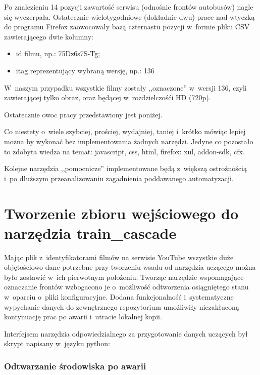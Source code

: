 Po znalezieniu 14 pozycji zawartość serwisu (odnośnie frontów autobusów) nagle się
wyczerpała. Ostatecznie wielotygodniowe (dokładnie dwu) prace nad wtyczką do programu 
Firefox zaowocowały bazą czternastu pozycji w~formie pliku CSV zawierającego dwie
kolumny:

\begin{itemize}
    \item id filmu, np.: 75Dz6s7S-Tg;
    \item itag reprezentujący wybraną wersję, np.: 136
\end{itemize}

W~naszym przypadku wszystkie filmy zostały ,,oznaczone'' w~wersji 136, czyli
zawierającej tylko obraz, oraz będącej w~rozdzielczośći HD (720p).

Ostatecznie owoc pracy przedstawiony jest poniżej.



Co niestety o~wiele szybciej, prościej, wydajniej, taniej i~krótko mówiąc lepiej można
by wykonać bez implementowania żadnych narzędzi. Jedyne co pozostało to zdobyta wiedza
na temat: javascript, css, html, firefox: xul, addon-sdk, cfx. 

Kolejne narzędzia ,,pomocnicze'' implementowane będą z~większą ostrożnością i~po
dłuższym przeanalizowaniu zagadnienia poddawanego automatyzacji.

\section{Tworzenie zbioru wejściowego do narzędzia train\_cascade}

Mając plik z~identyfikatorami filmów na serwisie YouTube wszystkie duże objętościowo
dane potrzebne przy tworzeniu wsadu od narzędzia uczącego można było zostawić
w~ich pierwotnym położeniu. Tworząc narzędzie wspomagające oznaczanie frontów
wzbogacono je o~możliwość odtworzenia osiągniętego stanu w~oparciu o~pliki konfiguracyjne.
Dodana funkcjonalność i~systematyczne wypychanie danych do zewnętrznego repozytorium
umożliwiły niezakłuconą kontynuację prac po awarii i~utracie lokalnej kopii.

Interfejsem narzędzia odpowiedzialnego za przygotowanie danych uczących był skrypt
napisany w~języku python:



\subsubsection{Odtwarzanie środowiska po awarii}

